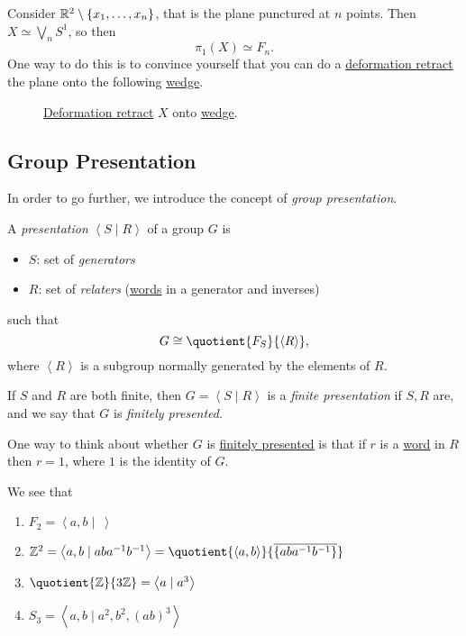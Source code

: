 \begin{exercise}
	Consider \(\mathbb{\MakeUppercase{r}} ^2 \setminus \{x_1, \ldots , x_n \}\), that is the plane punctured at \(n\) points. Then \(X \simeq \bigvee_n S^1\), so then
	\[
		\pi _1(X)\simeq F_n.
	\]
	One way to do this is to convince yourself that you can do a \hyperref[def:deformation-retraction]{deformation retract} the plane onto the following \hyperref[sssec:Wedge-sum]{wedge}.
	\begin{figure}[H]
		\centering
		\caption{\hyperref[def:deformation-retraction]{Deformation retract} \(X\) onto \hyperref[sssec:Wedge-sum]{wedge}.}
		\label{fig:lec11:ex}
	\end{figure}
\end{exercise}

\subsection{Group Presentation}
In order to go further, we introduce the concept of \emph{group presentation}.
\begin{definition}\label{def:group-presentation}
	A \emph{presentation} \(\left< S \mid R \right> \) of a group \(G\) is
	\begin{itemize}
		\item \(S\): set of \emph{generators}
		\item \(R\): set of \emph{relaters} (\hyperref[def:word]{words} in a generator and inverses)
	\end{itemize}
	such that
	\[
		G\cong \quotient{F_S}{\left< R \right>},
	\]
	where \(\left< R \right> \) is a subgroup normally generated by the elements of \(R\).
\end{definition}

\begin{definition}\label{def:finite-presentation}
	If \(S\) and \(R\) are both finite, then \(G = \left< S \mid R \right> \) is a \emph{finite presentation} if \(S, R\) are, and we say that \(G\) is \emph{finitely presented}.
\end{definition}
\begin{note}
	One way to think about whether \(G\) is \hyperref[def:finite-presentation]{\underline{finitely presented}} is that if \(r\) is a
	\hyperref[def:word]{word} in \(R\) then \(r = 1\), where \(1\) is the identity of \(G\).
\end{note}

\begin{eg}
	We see that
	\begin{enumerate}
		\item \(F_2 = \left< a, b \mid\ \right> \)
		\item \(\mathbb{\MakeUppercase{z}} ^2 = \left< a, b \mid aba^{-1} b^{-1}  \right> = \quotient{\left< a, b \right> }{\overline{\{aba^{-1} b^{-1} \}}} \)
		\item \(\quotient{\mathbb{\MakeUppercase{z}}}{3\mathbb{\MakeUppercase{z}}} = \left< a \mid a^3 \right> \)
		\item \(S_3 = \left< a, b \mid a^2, b^2, (ab)^3 \right> \)
	\end{enumerate}
\end{eg}


